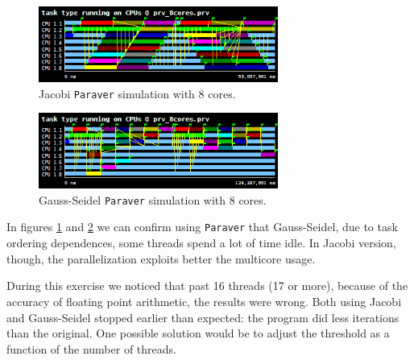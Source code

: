 \documentclass[a4paper,11pt]{article}
\begin{document}
\begin{enumerate}
\begin{figure}[h!]
  \center
  \includegraphics[width=0.7\textwidth]{figs/j_8cores.png}
  \caption{Jacobi \texttt{Paraver} simulation with 8 cores.}
  \label{fig:j-simul}
\end{figure}

\begin{figure}[h!]
  \center
  \includegraphics[width=0.7\textwidth]{figs/gs_8cores.png}
  \caption{Gauss-Seidel \texttt{Paraver} simulation with 8 cores.}
  \label{fig:gs-simul}
\end{figure}

In figures \ref{fig:j-simul} and \ref{fig:gs-simul} we can confirm using
\texttt{Paraver} that Gauss-Seidel, due to task ordering dependences,
some threads spend a lot of time idle. In Jacobi version, though, the
parallelization exploits better the multicore usage.


During this exercise we noticed that past 16 threads (17 or more), because of the
accuracy of floating point arithmetic, the results were wrong. Both
using Jacobi and Gauss-Seidel stopped earlier than expected: the
program did less iterations than the original. One possible solution
would be to adjust the threshold as a function of the number of
threads.


\end{enumerate}
\end{document}

